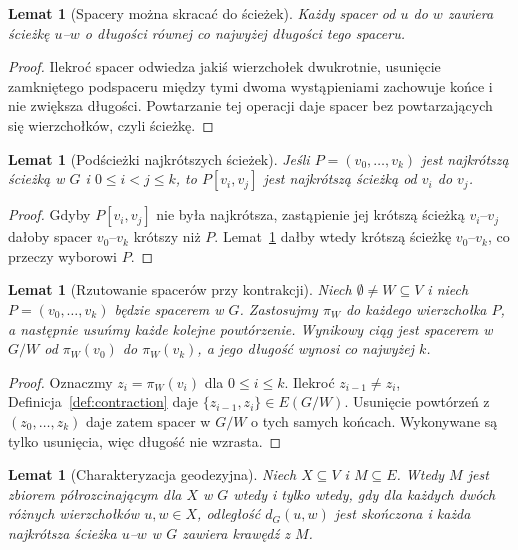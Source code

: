 \documentclass[11pt,a4paper]{amsart}
\theoremstyle{definition}
\theoremstyle{plain}
\newtheorem{lemma}[definition]{Lemat}
\newcommand{\dist}[3]{d_{#1}(#2,#3)}
\begin{document}
\begin{lemma}[Spacery można skracać do ścieżek]\label{lem:walk-to-path}
Każdy spacer od $u$ do $w$ zawiera ścieżkę $u$--$w$ o długości równej co najwyżej długości tego spaceru.
\end{lemma}

\begin{proof}
Ilekroć spacer odwiedza jakiś wierzchołek dwukrotnie, usunięcie zamkniętego podspaceru między tymi dwoma wystąpieniami zachowuje końce i nie zwiększa długości. Powtarzanie tej operacji daje spacer bez powtarzających się wierzchołków, czyli ścieżkę.
\end{proof}

\begin{lemma}[Podścieżki najkrótszych ścieżek]\label{lem:subpath-shortest}
Jeśli $P=(v_0,\dots,v_k)$ jest najkrótszą ścieżką w $G$ i $0\le i<j\le k$, to $P[v_i,v_j]$ jest najkrótszą ścieżką od $v_i$ do $v_j$.
\end{lemma}

\begin{proof}
Gdyby $P[v_i,v_j]$ nie była najkrótsza, zastąpienie jej krótszą ścieżką $v_i$--$v_j$ dałoby spacer $v_0$--$v_k$ krótszy niż $P$. Lemat~\ref{lem:walk-to-path} dałby wtedy krótszą ścieżkę $v_0$--$v_k$, co przeczy wyborowi $P$.
\end{proof}

\begin{lemma}[Rzutowanie spacerów przy kontrakcji]\label{lem:projected-walk}
Niech $\emptyset\neq W\subseteq V$ i niech $P=(v_0,\dots,v_k)$ będzie spacerem w $G$. Zastosujmy $\pi_W$ do każdego wierzchołka $P$, a następnie usuńmy każde kolejne powtórzenie. Wynikowy ciąg jest spacerem w $G/W$ od $\pi_W(v_0)$ do $\pi_W(v_k)$, a jego długość wynosi co najwyżej $k$.
\end{lemma}

\begin{proof}
Oznaczmy $z_i=\pi_W(v_i)$ dla $0\le i\le k$. Ilekroć $z_{i-1}\neq z_i$, Definicja~\ref{def:contraction} daje $\{z_{i-1},z_i\}\in E(G/W)$. Usunięcie powtórzeń z $(z_0,\dots,z_k)$ daje zatem spacer w $G/W$ o tych samych końcach. Wykonywane są tylko usunięcia, więc długość nie wzrasta.
\end{proof}

\begin{lemma}[Charakteryzacja geodezyjna]\label{lem:geodesic-characterization}
Niech $X\subseteq V$ i $M\subseteq E$. Wtedy $M$ jest zbiorem półrozcinającym dla $X$ w $G$ wtedy i tylko wtedy, gdy dla każdych dwóch różnych wierzchołków $u,w\in X$, odległość $\dist{G}{u}{w}$ jest skończona i każda najkrótsza ścieżka $u$--$w$ w $G$ zawiera krawędź z $M$.
\end{lemma}
\end{document}
